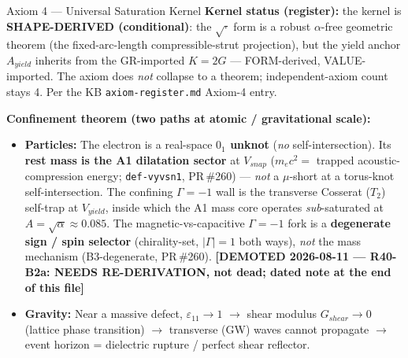\begin{resultbox}{Axiom 4 — Universal Saturation Kernel}
\medskip\noindent
\textbf{Kernel status (register):} the kernel is \textbf{SHAPE-DERIVED (conditional)}: the $\sqrt{\cdot}$ form is a robust $\alpha$-free geometric theorem (the fixed-arc-length compressible-strut projection), but the yield anchor $A_{yield}$ inherits from the GR-imported $K = 2G$ --- FORM-derived, VALUE-imported. The axiom does \emph{not} collapse to a theorem; independent-axiom count stays 4. Per the KB \texttt{axiom-register.md} Axiom-4 entry.

\medskip\noindent
\textbf{Confinement theorem (two paths at atomic / gravitational scale):}
\begin{itemize}
    \item \textbf{Particles:} The electron is a real-space \textbf{$0_1$ unknot} (\emph{no} self-intersection). Its \textbf{rest mass is the A1 dilatation sector} at $V_{snap}$ ($m_e c^2 = $ trapped acoustic-compression energy; \texttt{def-vyvsn1}, PR\,\#260) --- \emph{not} a $\mu$-short at a torus-knot self-intersection. The confining $\Gamma = -1$\gammaundeclared{} wall is the transverse Cosserat ($T_2$) self-trap at $V_{yield}$, inside which the A1 mass core operates \emph{sub}-saturated at $A = \sqrt{\alpha} \approx 0.085$. The magnetic-vs-capacitive $\Gamma = -1$\gammaundeclared{} fork is a \textbf{degenerate sign / spin selector} (chirality-set, $|\Gamma| = 1$\gammaundeclared{} both ways), \emph{not} the mass mechanism (B3-degenerate, PR\,\#260). \textbf{[DEMOTED 2026-08-11 --- R40-B2a: NEEDS RE-DERIVATION, not dead; dated note at the end of this file]}
    \item \textbf{Gravity:} Near a massive defect, $\varepsilon_{11} \to 1$
    $\to$ shear modulus $G_{shear} \to 0$ (lattice phase transition)
    $\to$ transverse (GW) waves cannot propagate
    $\to$ event horizon = dielectric rupture / perfect shear reflector.
\end{itemize}
\end{resultbox}
%
